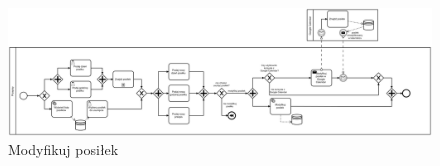 \documentclass{article}
\begin{document}
\begin{landscape}
\begin{figure}[!ht]
  \centering
    \includegraphics[width=1.5\textwidth]{ok2}\par\vspace{1cm}
  \caption{Modyfikuj posiłek}
\end{figure}
\end{landscape}
\end{document}

